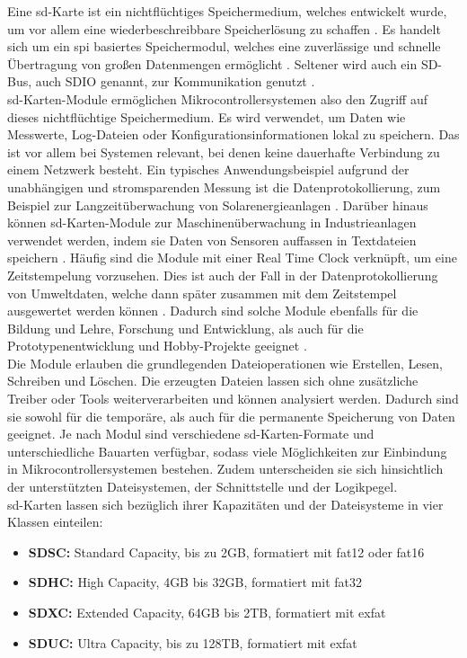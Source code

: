 Eine \acs{sd}-Karte ist ein nichtflüchtiges Speichermedium, welches entwickelt wurde, um vor allem eine wiederbeschreibbare Speicherlösung zu schaffen \cite {vaishnavi_arduino_2021}. Es handelt sich um ein \ac{spi} basiertes Speichermodul, welches eine zuverlässige und schnelle Übertragung von großen Datenmengen ermöglicht \cite{veeramanikandasamy_microcontroller_2016}. Seltener wird auch ein SD-Bus, auch SDIO genannt, zur Kommunikation genutzt \cite{veeramanikandasamy_microcontroller_2016}.
\\
\acs{sd}-Karten-Module ermöglichen Mikrocontrollersystemen also den Zugriff auf dieses nichtflüchtige Speichermedium. Es wird verwendet, um Daten wie Messwerte, Log-Dateien oder Konfigurationsinformationen lokal zu speichern. Das ist vor allem bei Systemen relevant, bei denen keine dauerhafte Verbindung zu einem Netzwerk besteht. Ein typisches Anwendungsbeispiel aufgrund der unabhängigen und stromsparenden Messung ist die Datenprotokollierung, zum Beispiel zur Langzeitüberwachung von Solarenergieanlagen \cite{hadi_standalone_2018}. Darüber hinaus können \acs{sd}-Karten-Module zur Maschinenüberwachung in Industrieanlagen verwendet werden, indem sie Daten von Sensoren auffassen in Textdateien speichern \cite{veeramanikandasamy_microcontroller_2016}. Häufig sind die Module mit einer Real Time Clock verknüpft, um eine Zeitstempelung vorzusehen. Dies ist auch der Fall in der Datenprotokollierung von Umweltdaten, welche dann später zusammen mit dem Zeitstempel ausgewertet werden können \cite{vaishnavi_arduino_2021}. Dadurch sind solche Module ebenfalls für die Bildung und Lehre, Forschung und Entwicklung, als auch für die Prototypenentwicklung und Hobby-Projekte geeignet \cite{roboter-bausatzde_micro_2025}.
\\
Die Module erlauben die grundlegenden Dateioperationen wie Erstellen, Lesen, Schreiben und Löschen. Die erzeugten Dateien lassen sich ohne zusätzliche Treiber oder Tools weiterverarbeiten und können analysiert werden. Dadurch sind sie sowohl für die temporäre, als auch für die permanente Speicherung von Daten geeignet.
Je nach Modul sind verschiedene \acs{sd}-Karten-Formate und unterschiedliche Bauarten verfügbar, sodass viele Möglichkeiten zur Einbindung in Mikrocontrollersystemen bestehen. Zudem unterscheiden sie sich hinsichtlich der unterstützten Dateisystemen, der Schnittstelle und der Logikpegel.\\

\acs{sd}-Karten lassen sich bezüglich ihrer Kapazitäten und der Dateisysteme in vier Klassen einteilen:
\begin{itemize}
    \item \textbf{SDSC:}
    Standard Capacity, bis zu 2GB, formatiert mit \acs{fat}12 oder \acs{fat}16
    \item \textbf{SDHC:}
    High Capacity, 4GB bis 32GB, formatiert mit \acs{fat}32
    \item \textbf{SDXC:}
    Extended Capacity, 64GB bis 2TB, formatiert mit ex\acs{fat}
    \item \textbf{SDUC:}
    Ultra Capacity, bis zu 128TB, formatiert mit ex\acs{fat}
\end{itemize}

